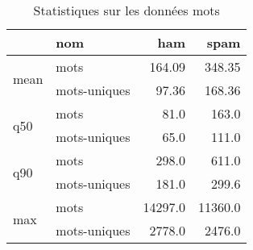 \begin{table}[H]
\centering
\caption{Statistiques sur les données mots}
\label{tab:f_mots}
\begin{tabular}{ll|rr}
\toprule
 & nom & ham & spam \\
\midrule
\multirow[c]{2}{*}{mean} & mots & 164.09 & 348.35 \\
 & mots-uniques & 97.36 & 168.36 \\
\cline{1-4}
\multirow[c]{2}{*}{q50} & mots & 81.0 & 163.0 \\
 & mots-uniques & 65.0 & 111.0 \\
\cline{1-4}
\multirow[c]{2}{*}{q90} & mots & 298.0 & 611.0 \\
 & mots-uniques & 181.0 & 299.6 \\
\cline{1-4}
\multirow[c]{2}{*}{max} & mots & 14297.0 & 11360.0 \\
 & mots-uniques & 2778.0 & 2476.0 \\
\cline{1-4}
\bottomrule
\end{tabular}
\end{table}

